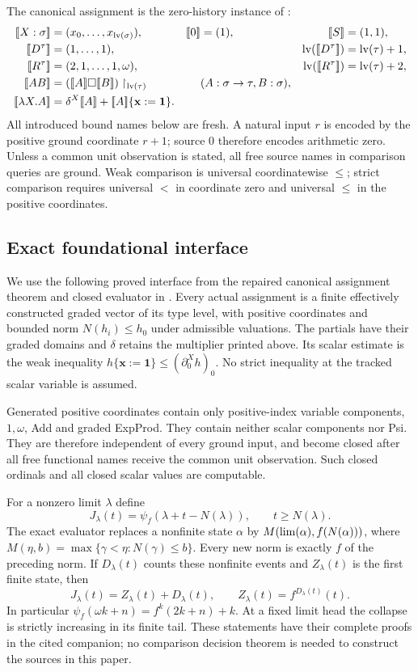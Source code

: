 The canonical assignment is the zero-history instance of
\cite[Definition~3.1]{ww}:
\begin{align*}
 \can{X:\sigma}&=(x_0,\ldots,x_{\lv(\sigma)}),&
 \can0&=(1),&\can S&=(1,1),\\
 \can{D^\tau}&=(1,\ldots,1),&&&
 \lv(\can{D^\tau})&=\lv(\tau)+1,\\
 \can{R^\tau}&=(2,1,\ldots,1,\omega),&&&
 \lv(\can{R^\tau})&=\lv(\tau)+2,\\
 \can{AB}&=(\can A\square\can B)\upharpoonright_{\lv(\tau)}
                  &&(A:\sigma\to\tau, B:\sigma),\\
 \can{\lambda X.A}&=\delta^X\can A+
                           \can A\{\mathbf x:=\mathbf1\}.
\end{align*}
All introduced bound names below are fresh. A natural input $r$ is
encoded by the positive ground coordinate $r+1$; source $0$ therefore
encodes arithmetic zero. Unless a common unit observation is stated,
all free source names in comparison queries are ground. Weak comparison
is universal coordinatewise $\le$; strict comparison requires universal
$<$ in coordinate zero and universal $\le$ in the positive coordinates.

\subsection{Exact foundational interface}

We use the following proved interface from the repaired canonical
assignment theorem and closed evaluator in \cite{groundcomparison}.
Every actual assignment is a finite effectively constructed graded
vector of its type level, with positive coordinates and bounded norm
$N(h_i)\le h_0$ under admissible valuations. The partials have their
graded domains and $\delta$ retains the multiplier printed above.
Its scalar estimate is the weak inequality
$h\{\mathbf x:=\mathbf1\}\le(\partial_0^Xh)_0$.
No strict inequality at the tracked scalar variable is assumed.

Generated positive coordinates contain only positive-index variable
components, $1,\omega$, Add and graded ExpProd. They contain neither
scalar components nor Psi. They are therefore independent of every
ground input, and become closed after all free functional names receive
the common unit observation. Such closed ordinals and all closed scalar
values are computable.

For a nonzero limit $\lambda$ define
\[
 J_\lambda(t)=\psi_f(\lambda+t-N(\lambda)),\qquad t\ge N(\lambda).
\]
The exact evaluator replaces a nonfinite state $\alpha$ by
$M(\operatorname{lim}(\alpha),f(N(\alpha)))$, where
$M(\eta,b)=\max\{\gamma<\eta:N(\gamma)\le b\}$.
Every new norm is exactly $f$ of the preceding norm. If $D_\lambda(t)$
counts these nonfinite events and $Z_\lambda(t)$ is the first finite
state, then
\[
 J_\lambda(t)=Z_\lambda(t)+D_\lambda(t),\qquad
 Z_\lambda(t)=f^{D_\lambda(t)}(t).
\]
In particular $\psi_f(\omega k+n)=f^k(2k+n)+k$.
At a fixed limit head the collapse is strictly increasing in its
finite tail. These statements have their complete proofs in the cited
companion; no comparison decision theorem is needed to construct the
sources in this paper.

